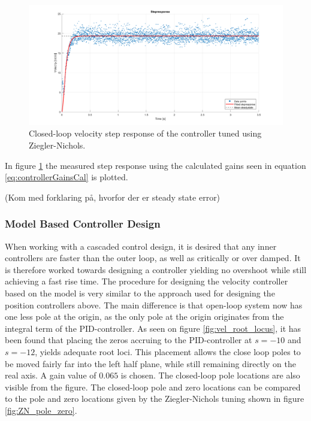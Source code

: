 \documentclass[../../main.tex]{subfiles}
\begin{document}
\begin{figure}
    \centering
    \includegraphics[width = 1\textwidth]{Sections/System_Design/Images/Step_Implemented_NZ.png}
    \caption{Closed-loop velocity step response of the controller tuned using Ziegler-Nichols.}
    \label{fig:NZ_implemented}
\end{figure}


In figure \ref{fig:NZ_implemented} the measured step response using the calculated gains seen in equation \ref{eq:controllerGainsCal} is plotted. 

(Kom med forklaring på, hvorfor der er steady state error)

\subsubsection{Model Based Controller Design}
When working with a cascaded control design, it is desired that any inner controllers are faster than the outer loop, as well as critically or over damped. It is therefore worked towards designing a controller yielding no overshoot while still achieving a fast rise time.
The procedure for designing the velocity controller based on the model is very similar to the approach used for designing the position controllers above. The main difference is that open-loop system now has one less pole at the origin, as the only pole at the origin originates from the integral term of the PID-controller. As seen on figure \ref{fig:vel_root_locus}, it has been found that placing the zeros accruing to the PID-controller at $s = -10$ and $s = -12$, yields adequate root loci. This placement allows the close loop poles to be moved fairly far into the left half plane, while still remaining directly on the real axis. A gain value of $0.065$ is chosen. The closed-loop pole locations are also visible from the figure. The closed-loop pole and zero locations can be compared to the pole and zero locations given by the Ziegler-Nichols tuning shown in figure \ref{fig:ZN_pole_zero}.
\end{document}
